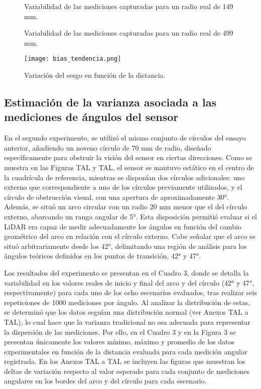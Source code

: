 \begin{figure}[H]
	\centering
	\caption{Variabilidad de las mediciones capturadas para un radio real de 149 mm.}
	\label{fig:lecturas1}
\end{figure}

\begin{figure}[H]
	\centering
	\caption{Variabilidad de las mediciones capturadas para un radio real de 499 mm.}
	\label{fig:lecturas2}
\end{figure}

\begin{figure}[H]
	\centering
	\texttt{[image: bias\_tendencia.png]}
	\caption{Variación del sesgo en función de la distancia.}
	\label{fig:bias_tendencia}
\end{figure}

\subsection{Estimación de la varianza asociada a las mediciones de ángulos del sensor}

En el segundo experimento, se utilizó el mismo conjunto de círculos del ensayo anterior, añadiendo un noveno círculo de 70 mm de radio, diseñado específicamente para obstruir la visión del sensor en ciertas direcciones. Como se muestra en las Figuras TAL y TAL, el sensor se mantuvo estático en el centro de la cuadrícula de referencia, mientras se disponían dos círculos adicionales: uno externo que correspondiente a uno de los círculos previamente utilizados, y el círculo de obstrucción visual, con una apertura de aproximadamente 30°.  Además, se situó un arco circular con un radio 20 mm menor que el del círculo externo, abarcando un rango angular de 5°. Esta disposición permitió evaluar si el LiDAR era capaz de medir adecuadamente los ángulos en función del cambio geométrico del arco en relación con el círculo externo. Cabe señalar que el arco se situó arbitrariamente desde los 42°, delimitando una región de análisis para los ángulos teóricos definidos en los puntos de transición, 42° y 47°.


Los resultados del experimento se presentan en el Cuadro 3, donde se detalla la variabilidad en los valores reales de inicio y final del arco y del círculo (42° y 47°, respectivamente) para cada uno de los ocho escenarios evaluados, tras realizar seis repeticiones de 1000 mediciones por ángulo. Al analizar la distribución de estas, se determinó que los datos seguían una distribución normal (ver Anexos TAL a TAL), lo cual hace que la varianza tradicional no sea adecuada para representar la dispersión de las mediciones. Por ello, en el Cuadro 3 y en la Figura 3 se presentan únicamente los valores mínimo, máximo y promedio de los datos experimentales en función de la distancia evaluada para cada medición angular registrada. En los Anexos TAL a TAL se incluyen las figuras que muestran los deltas de variación respecto al valor esperado para cada conjunto de mediciones angulares en los bordes del arco y del círculo para cada escenario.



